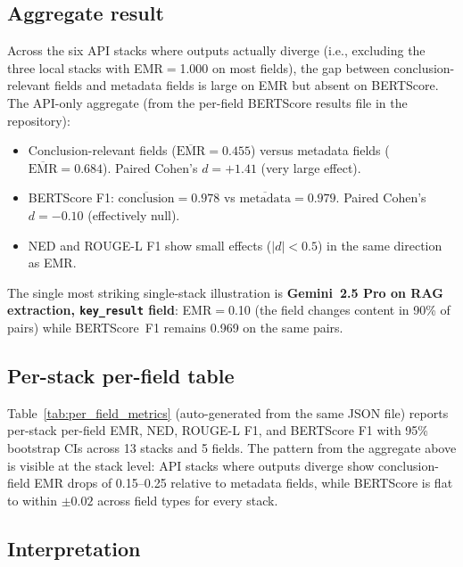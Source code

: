\documentclass[11pt]{article}
\begin{document}
\subsection{Aggregate result}

Across the six API stacks where outputs actually diverge (i.e., excluding the three local stacks with EMR${=}$1.000 on most fields), the gap between conclusion-relevant fields and metadata fields is large on EMR but absent on BERTScore. The API-only aggregate (from the per-field BERTScore results file in the repository):

\begin{itemize}[leftmargin=*]
  \item Conclusion-relevant fields ($\overline{\text{EMR}}{=}0.455$) versus metadata fields ($\overline{\text{EMR}}{=}0.684$). Paired Cohen's $d{=}+1.41$ (very large effect).
  \item BERTScore F1: $\overline{\text{conclusion}}{=}0.978$ vs $\overline{\text{metadata}}{=}0.979$. Paired Cohen's $d{=}-0.10$ (effectively null).
  \item NED and ROUGE-L F1 show small effects ($|d|{<}0.5$) in the same direction as EMR.
\end{itemize}

\noindent The single most striking single-stack illustration is \textbf{Gemini~2.5 Pro on RAG extraction, \texttt{key\_result} field}: EMR${=}$0.10 (the field changes content in 90\% of pairs) while BERTScore~F1 remains 0.969 on the same pairs.

\subsection{Per-stack per-field table}

Table~\ref{tab:per_field_metrics} (auto-generated from the same JSON file) reports per-stack per-field EMR, NED, ROUGE-L F1, and BERTScore F1 with 95\% bootstrap CIs across 13 stacks and 5 fields. The pattern from the aggregate above is visible at the stack level: API stacks where outputs diverge show conclusion-field EMR drops of 0.15--0.25 relative to metadata fields, while BERTScore is flat to within $\pm 0.02$ across field types for every stack.

\subsection{Interpretation}
\end{document}
